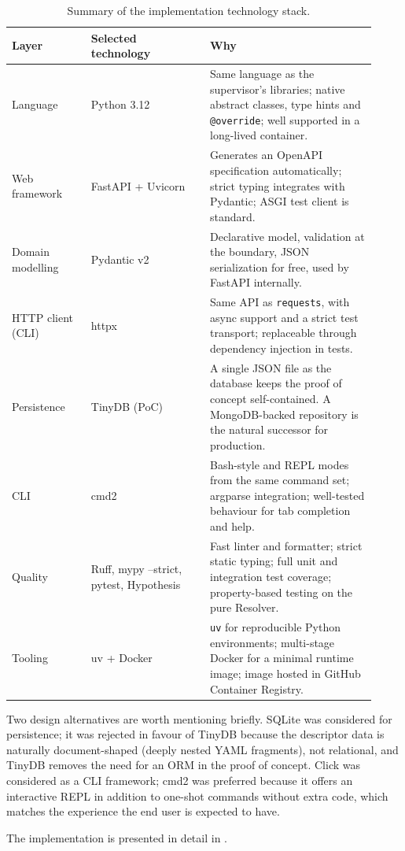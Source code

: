 \begin{table}[ht]
  \centering
  \small
  \begin{tabular}{p{0.20\linewidth} p{0.30\linewidth} p{0.42\linewidth}}
    \toprule
    \textbf{Layer} & \textbf{Selected technology} & \textbf{Why} \\
    \midrule
    Language &
    Python 3.12 &
    Same language as the supervisor's libraries; native abstract
    classes, type hints and \texttt{@override}; well supported in
    a long-lived container. \\
    Web framework &
    FastAPI + Uvicorn~\cite{fastapi-docs} &
    Generates an OpenAPI specification automatically; strict typing
    integrates with Pydantic; ASGI test client is standard. \\
    Domain modelling &
    Pydantic v2 &
    Declarative model, validation at the boundary, JSON
    serialization for free, used by FastAPI internally. \\
    HTTP client (CLI) &
    httpx &
    Same API as \texttt{requests}, with async support and a strict
    test transport; replaceable through dependency injection in
    tests. \\
    Persistence &
    TinyDB (PoC) &
    A single JSON file as the database keeps the proof of concept
    self-contained. A MongoDB-backed repository is the natural
    successor for production. \\
    CLI &
    cmd2 &
    Bash-style and REPL modes from the same command set; argparse
    integration; well-tested behaviour for tab completion and help. \\
    Quality &
    Ruff, mypy --strict,
    pytest, Hypothesis &
    Fast linter and formatter; strict static typing; full unit and
    integration test coverage; property-based testing on the pure
    Resolver. \\
    Tooling &
    uv + Docker &
    \texttt{uv} for reproducible Python environments; multi-stage
    Docker for a minimal runtime image; image hosted in GitHub
    Container Registry. \\
    \bottomrule
  \end{tabular}
  \caption{Summary of the implementation technology stack.}
  \label{tab:tech-stack}
\end{table}

Two design alternatives are worth mentioning briefly. SQLite was
considered for persistence; it was rejected in favour of TinyDB
because the descriptor data is naturally document-shaped (deeply
nested YAML fragments), not relational, and TinyDB removes the need
for an ORM in the proof of concept. Click was considered as a CLI
framework; cmd2 was preferred because it offers an interactive REPL
in addition to one-shot commands without extra code, which matches
the experience the end user is expected to have.

The implementation is presented in detail in .
